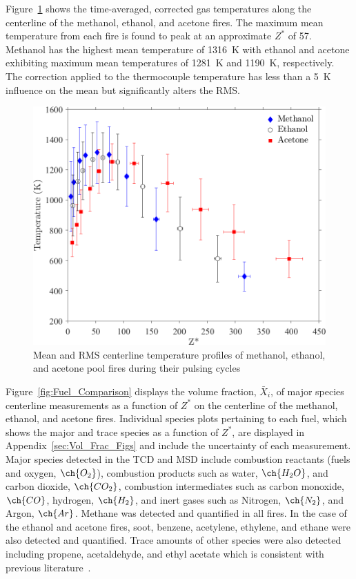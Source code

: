\documentclass[12pt]{article}
\begin{document}
Figure~\ref{fig:Temp_Comparison} shows the time-averaged, corrected gas temperatures along the centerline of the methanol, ethanol, and acetone fires. The maximum mean temperature from each fire is found to peak at an approximate $Z^{*}$ of 57. Methanol has the highest mean temperature of 1316~K with ethanol and acetone exhibiting maximum mean temperatures of 1281~K and 1190~K, respectively. The correction applied to the thermocouple temperature has less than a 5~K influence on the mean but significantly alters the RMS.

\begin{figure}[h!]
	\centering
\includegraphics[width=11.0 cm, keepaspectratio]{Temperature_Comparison.png}
	\caption[Major Species Comparison]{Mean and RMS centerline temperature profiles of methanol, ethanol, and acetone pool fires during their pulsing cycles}
	\label{fig:Temp_Comparison}
\end{figure}

Figure~\ref{fig:Fuel_Comparison} displays the volume fraction, $\bar{X}_{i}$, of major species centerline measurements as a function of $Z^{*}$ on the centerline of the methanol, ethanol, and acetone fires. Individual species plots pertaining to each fuel, which shows the major and trace species as a function of $Z^{*}$, are displayed in Appendix~\ref{sec:Vol_Frac_Figs} and include the uncertainty of each measurement. Major species detected in the TCD and MSD include combustion reactants (fuels and oxygen, $\ch{O_2}$), combustion products such as water, $\ch{H_{2}O}$, and carbon dioxide, $\ch{CO_{2}}$, combustion intermediates such as carbon monoxide, $\ch{CO}$, hydrogen, $\ch{H_{2}}$, and inert gases such as Nitrogen, $\ch{N_{2}}$, and Argon, $\ch{Ar}$. Methane was detected and quantified in all fires. In the case of the ethanol and acetone fires, soot, benzene, acetylene, ethylene, and ethane were also detected and quantified. Trace amounts of other species were also detected including propene, acetaldehyde, and ethyl acetate which is consistent with previous literature~\cite{Pichon2009, Gong2015}.
\end{document}
